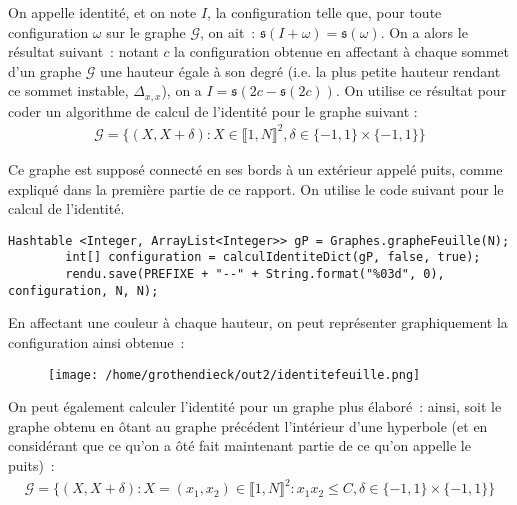 \documentclass{article}
\begin{document}
On appelle identité, et on note $I$, la configuration telle que, pour toute configuration $\omega$ sur le graphe $\mathcal{G}$, on ait : $\mathfrak{s}(I+\omega)=\mathfrak{s}(\omega)$. On a alors le résultat suivant : notant $c$ la configuration obtenue en affectant à chaque sommet d'un graphe $\mathcal{G}$ une hauteur égale à son degré (i.e. la plus petite hauteur rendant ce sommet instable, $\Delta_{x,x}$), on a $I=\mathfrak{s}(2c-\mathfrak{s}(2c))$. On utilise ce résultat pour coder un algorithme de calcul de l'identité pour le graphe suivant :
\begin{align*}
	\mathcal{G} = \{(X,X+\delta) : X\in\llbracket 1, N\rrbracket^2, \delta\in\{-1,1\}\times\{-1,1\}\}
\end{align*}


Ce graphe est supposé connecté en ses bords à un extérieur appelé puits, comme expliqué dans la première partie de ce rapport.
On utilise le code suivant pour le calcul de l'identité.
\begin{lstlisting}
Hashtable <Integer, ArrayList<Integer>> gP = Graphes.grapheFeuille(N);
		int[] configuration = calculIdentiteDict(gP, false, true);
		rendu.save(PREFIXE + "--" + String.format("%03d", 0), configuration, N, N);
\end{lstlisting}
En affectant une couleur à chaque hauteur, on peut représenter graphiquement la configuration ainsi obtenue :

\begin{figure}[h]
	\centering
	\texttt{[image: /home/grothendieck/out2/identitefeuille.png]}
\end{figure}

On peut également calculer l'identité pour un graphe plus élaboré : ainsi, soit le graphe obtenu en ôtant au graphe précédent l'intérieur d'une hyperbole (et en considérant que ce qu'on a ôté fait maintenant partie de ce qu'on appelle le puits) :
\begin{align*}
	\mathcal{G} = \{(X,X+\delta) : X=(x_1,x_2)\in\llbracket1,N\rrbracket^2 : x_1x_2\leq C, \delta\in\{-1,1\}\times\{-1,1\}\} 
\end{align*}
\end{document}
